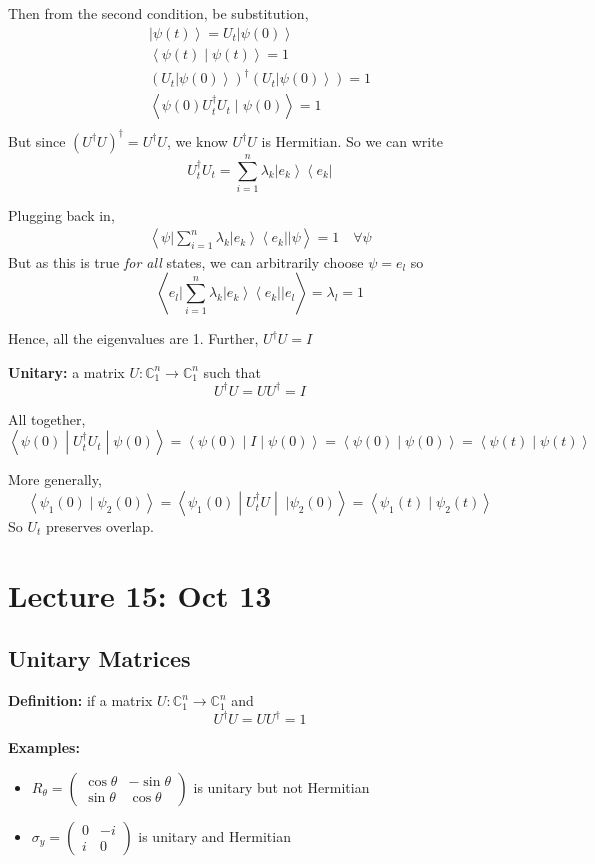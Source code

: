 \documentclass[12pt]{article}
\newcommand{\brak}[1]{\left\langle #1 \right\rangle}
\newcommand{\C}{\mathbb{C}}
\newcommand{\bra}[1]{\left\langle #1 \right\vert }
\newcommand{\ket}[1]{\left\vert #1 \right\rangle}
\begin{document}
Then from the second condition, be substitution,
\begin{gather*}
    \ket{\psi(t)} = U_t\ket{\psi(0)}\\ 
    \brak{\psi(t) \; | \; \psi(t)} = 1\\ 
    (U_t \ket{\psi(0)})^\dagger (U_t \ket{\psi(0)}) = 1\\
    \brak{\psi(0) U_t^\dagger U_t \; | \; \psi(0)} = 1\\
\end{gather*}
But since $(U^\dagger U)^\dagger = U^\dagger U$, we know $U^\dagger U$ is Hermitian. So we can write 
\[U_t^\dagger U_t = \sum_{i=1}^n \lambda_k \ket{e_k}\bra{e_k}\]

Plugging back in,
\begin{align*}
    \brak{\psi \bigg\vert \sum_{i=1}^n \lambda_k \ket{e_k}\bra{e_k} \bigg\vert \psi} = 1 \quad \forall \psi
\end{align*}
But as this is true \emph{for all} states, we can arbitrarily choose $\psi = e_l$ so 
\[\brak{e_l \bigg\vert \sum_{i=1}^n \lambda_k \ket{e_k}\bra{e_k} \bigg\vert e_l} = \lambda_l = 1\]

Hence, all the eigenvalues are 1. Further, $U^\dagger U = I$

\textbf{Unitary:} a matrix $U: \C_1^n \to \C_1^n$ such that 
\[U^\dagger U = UU^\dagger = I\]

All together, 
\[\brak{\psi(0) \; | \; U_t^\dagger U_t \; | \; \psi(0)} = \brak{\psi(0) \; | \; I \; | \; \psi(0)} = \brak{\psi(0) \; | \; \psi(0)} = \brak{\psi(t) \; | \; \psi(t)}\]

More generally, 
\[\brak{\psi_1(0) \; | \; \psi_2(0)} = \brak{\psi_1(0) \; | \; U_t^\dagger U \; | \; \; | \psi_2(0)} = \brak{\psi_1(t) \; | \; \psi_2(t)}\]
So $U_t$ preserves overlap. 

\section*{Lecture 15: Oct 13}
\subsection*{Unitary Matrices}
\textbf{Definition:} if a matrix $U: \C_1^n \to \C_1^n$ and 
\[U^\dagger U = UU^\dagger = 1\]

\textbf{Examples:}
\begin{itemize}
    \item $R_\theta = \begin{pmatrix}
        \cos \theta & -\sin \theta\\
        \sin \theta & \cos \theta
    \end{pmatrix}$ is unitary but not Hermitian

    \item $\sigma_y = \begin{pmatrix}
        0 & -i\\
        i & 0
    \end{pmatrix}$ is unitary and Hermitian 
\end{itemize}
\end{document}
